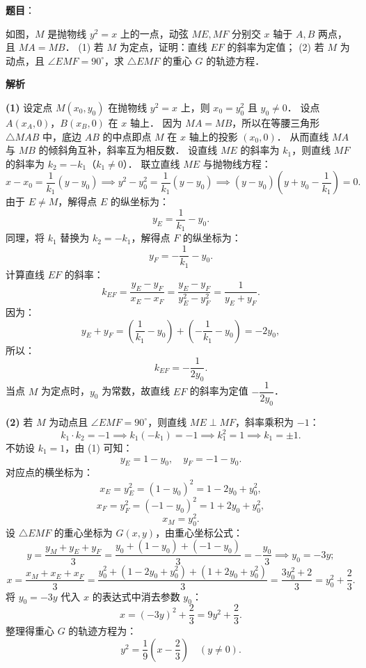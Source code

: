 \begin{answer}

\textbf{题目}：

如图，$M$ 是抛物线 $y^2 = x$ 上的一点，动弦 $ME, MF$ 分别交 $x$ 轴于 $A, B$ 两点，且 $MA = MB$．
(1) 若 $M$ 为定点，证明：直线 $EF$ 的斜率为定值；
(2) 若 $M$ 为动点，且 $\angle EMF = 90^\circ$，求 $\triangle EMF$ 的重心 $G$ 的轨迹方程．
\nopagebreak[4]
\begin{center}\end{center}
\nopagebreak[4]
\textbf{解析}

\textbf{(1)}
设定点 $M(x_0, y_0)$ 在抛物线 $y^2 = x$ 上，则 $x_0 = y_0^2$ 且 $y_0 \neq 0$．
设点 $A(x_A, 0)$，$B(x_B, 0)$ 在 $x$ 轴上．
因为 $MA = MB$，所以在等腰三角形 $\triangle MAB$ 中，底边 $AB$ 的中点即点 $M$ 在 $x$ 轴上的投影 $(x_0, 0)$．
从而直线 $MA$ 与 $MB$ 的倾斜角互补，斜率互为相反数．
设直线 $ME$ 的斜率为 $k_1$，则直线 $MF$ 的斜率为 $k_2 = -k_1$（$k_1 \neq 0$）．
联立直线 $ME$ 与抛物线方程：
\nopagebreak[4]
\[
x - x_0 = \dfrac{1}{k_1}(y - y_0) \implies y^2 - y_0^2 = \dfrac{1}{k_1}(y - y_0) \implies (y - y_0)\left(y + y_0 - \dfrac{1}{k_1}\right) = 0.
\]
由于 $E \neq M$，解得点 $E$ 的纵坐标为：
\nopagebreak[4]
\[
y_E = \dfrac{1}{k_1} - y_0.
\]
同理，将 $k_1$ 替换为 $k_2 = -k_1$，解得点 $F$ 的纵坐标为：
\nopagebreak[4]
\[
y_F = -\dfrac{1}{k_1} - y_0.
\]
计算直线 $EF$ 的斜率：
\nopagebreak[4]
\[
k_{EF} = \dfrac{y_E - y_F}{x_E - x_F} = \dfrac{y_E - y_F}{y_E^2 - y_F^2} = \dfrac{1}{y_E + y_F}.
\]
因为：
\nopagebreak[4]
\[
y_E + y_F = \left(\dfrac{1}{k_1} - y_0\right) + \left(-\dfrac{1}{k_1} - y_0\right) = -2y_0,
\]
所以：
\nopagebreak[4]
\[
k_{EF} = -\dfrac{1}{2y_0}.
\]
当点 $M$ 为定点时，$y_0$ 为常数，故直线 $EF$ 的斜率为定值 $-\dfrac{1}{2y_0}$．

\textbf{(2)}
若 $M$ 为动点且 $\angle EMF = 90^\circ$，则直线 $ME \perp MF$，斜率乘积为 $-1$：
\nopagebreak[4]
\[
k_1 \cdot k_2 = -1 \implies k_1(-k_1) = -1 \implies k_1^2 = 1 \implies k_1 = \pm 1.
\]
不妨设 $k_1 = 1$，由 (1) 可知：
\nopagebreak[4]
\[
y_E = 1 - y_0, \quad y_F = -1 - y_0.
\]
对应点的横坐标为：
\nopagebreak[4]
\[
x_E = y_E^2 = (1 - y_0)^2 = 1 - 2y_0 + y_0^2,
\]
\nopagebreak[4]
\[
x_F = y_F^2 = (-1 - y_0)^2 = 1 + 2y_0 + y_0^2,
\]
\nopagebreak[4]
\[
x_M = y_0^2.
\]
设 $\triangle EMF$ 的重心坐标为 $G(x, y)$，由重心坐标公式：
\nopagebreak[4]
\[
y = \dfrac{y_M + y_E + y_F}{3} = \dfrac{y_0 + (1 - y_0) + (-1 - y_0)}{3} = -\dfrac{y_0}{3} \implies y_0 = -3y;
\]
\nopagebreak[4]
\[
x = \dfrac{x_M + x_E + x_F}{3} = \dfrac{y_0^2 + (1 - 2y_0 + y_0^2) + (1 + 2y_0 + y_0^2)}{3} = \dfrac{3y_0^2 + 2}{3} = y_0^2 + \dfrac{2}{3}.
\]
将 $y_0 = -3y$ 代入 $x$ 的表达式中消去参数 $y_0$：
\nopagebreak[4]
\[
x = (-3y)^2 + \dfrac{2}{3} = 9y^2 + \dfrac{2}{3}.
\]
整理得重心 $G$ 的轨迹方程为：
\nopagebreak[4]
\[
y^2 = \dfrac{1}{9}\left(x - \dfrac{2}{3}\right) \quad (y \neq 0).
\]


\end{answer}
